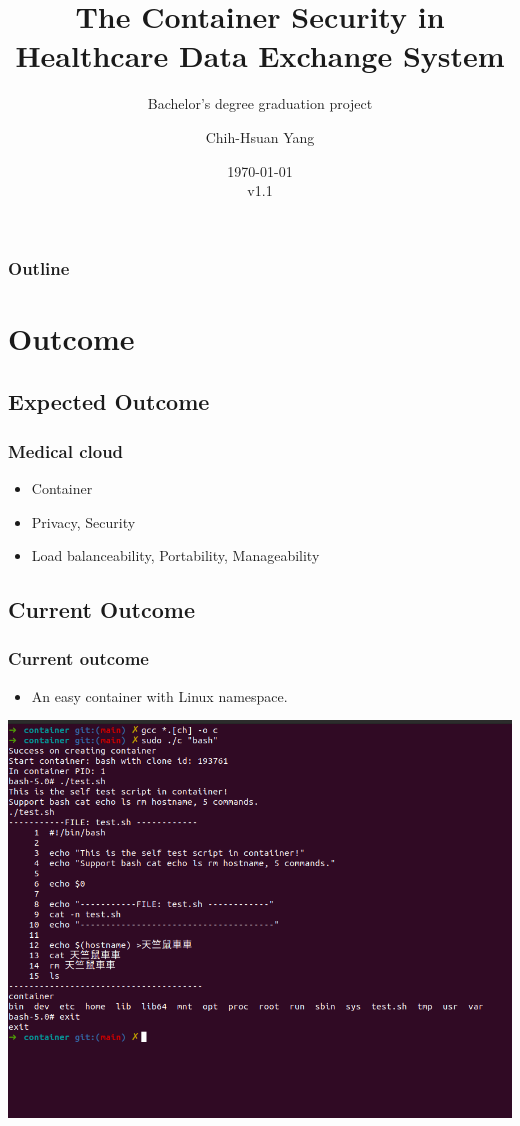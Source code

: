\documentclass{beamer}
\title{The Container Security in Healthcare Data Exchange System}
\subtitle{Bachelor's degree graduation project}
\author{Chih-Hsuan Yang}
\institute{National Sun Yat-sen University}
\date{\today\\v1.1}
\begin{document}
\begin{frame}
    \titlepage
\end{frame}

\begin{frame}
    \frametitle{Outline}
    \tableofcontents
\end{frame}

\section{Outcome}
\subsection{Expected Outcome}
\begin{frame}
    \frametitle{Medical cloud}
    \begin{itemize}
        \item Container
        \item Privacy, Security
        \item Load balanceability, Portability, Manageability
    \end{itemize}
\end{frame}

\subsection{Current Outcome}
\begin{frame}
    \frametitle{Current outcome}
    \begin{itemize}
        \item An easy container with Linux namespace.
    \end{itemize}
    \centering\includegraphics[width=1.0\textwidth]{cur_cont.png}
\end{frame}
\end{document}
